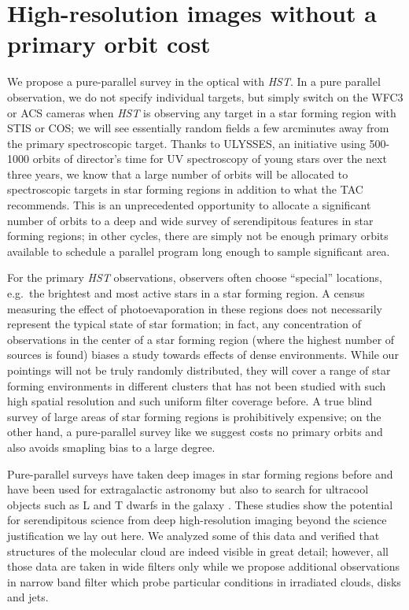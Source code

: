 \documentclass[12pt]{article}
\begin{document}
\section{High-resolution images without a primary orbit cost}
We propose a pure-parallel survey in the optical with \emph{HST}. In a pure
parallel observation, we do not specify individual targets, but simply switch
on the WFC3 or ACS cameras when \emph{HST} is observing any target in a star
forming region with STIS or COS; we will see essentially random fields a few
arcminutes away from the primary spectroscopic target. Thanks to ULYSSES, an
initiative using 500-1000 orbits of director's time for UV spectroscopy of
young stars over the next three years, we know that a large number of orbits
will be allocated to spectroscopic targets in star forming regions in addition
to what the TAC recommends. This is an unprecedented opportunity to allocate a significant number of orbits to a deep and wide survey of serendipitous features in star forming regions; in other cycles, there are simply not be enough primary orbits available to schedule a parallel program long enough to sample significant area.

For the primary
\emph{HST} observations, observers often choose ``special'' locations,
e.g.\ the brightest and most active stars in a star forming region. A census
measuring the effect of photoevaporation in these regions does not necessarily
represent the typical state of star formation; in fact, any concentration of
observations in the center of a star forming region (where the highest number
of sources is found) biases a study towards effects of dense
environments. While our pointings will not be truly randomly distributed, they
will cover a range of star forming environments in different clusters that has
not been studied with such high spatial resolution and such uniform filter
coverage before. A true blind survey of large areas of star forming regions is prohibitively expensive; on the other hand, a pure-parallel survey like we suggest costs no primary orbits and also avoids smapling bias to a large degree.

Pure-parallel surveys have taken deep images in star forming regions before and
have been used for extragalactic astronomy \citep{2007A&A...468..823S} but also
to search for ultracool objects such as L and T dwarfs in the galaxy
\citep{2005ApJ...631L.159R}. These studies show the potential for serendipitous
science from deep high-resolution imaging beyond the science justification we
lay out here. We analyzed some of this data and verified that structures of the
molecular cloud are indeed visible in great detail; however, all those data are
taken in wide filters only while we propose additional observations in narrow
band filter which probe particular conditions in irradiated clouds, disks and
jets.
\end{document}
